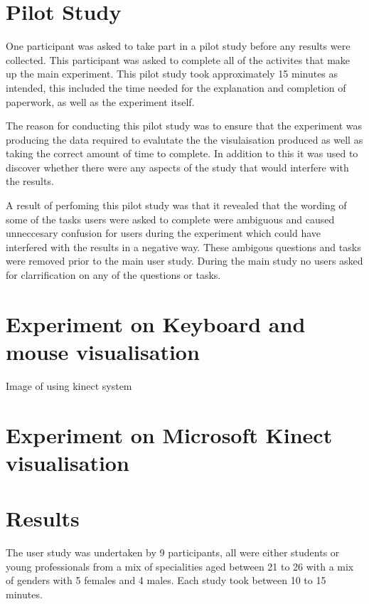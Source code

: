 \section{Pilot Study}
One participant was asked to take part in a pilot study before any results were
collected. This participant was asked to complete all of the activites that make
up the main experiment. This pilot study took approximately 15 minutes as
intended, this included the time needed for the explanation and completion of
paperwork, as well as the experiment itself.

The reason for conducting this pilot study was to ensure that the experiment was
producing the data required to evalutate the the visulaisation produced as well
as taking the correct amount of time to complete. In addition to this it was
used to discover whether there were any aspects of the study that would
interfere with the results.

A result of perfoming this pilot study was that it revealed that the wording of
some of the tasks users were asked to complete were ambiguous and caused
unneccesary confusion for users during the experiment which could have
interfered with the results in a negative way. These ambigous questions and
tasks were removed prior to the main user study. During the main study no users
asked for  clarrification on any of the questions or tasks.

\section{Experiment on Keyboard and mouse visualisation}
Image of using kinect system

\section{Experiment on Microsoft Kinect visualisation}

\section{Results}
The user study was undertaken by 9 participants, all were either students or
young professionals from a mix of specialities aged between 21 to 26 with a mix
of genders with 5 females and 4 males. Each study took between 10 to 15 minutes.


